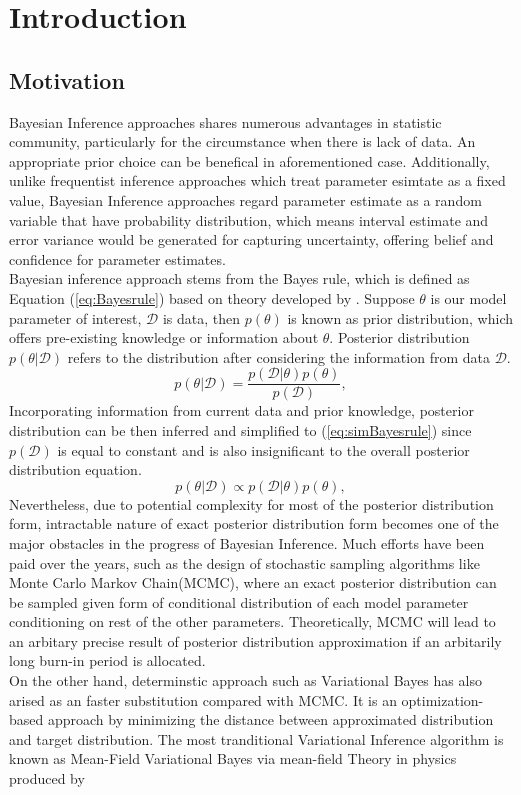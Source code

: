 \chapter{Introduction}
\label{Chapter1}
\section{Motivation}
Bayesian Inference approaches shares numerous advantages in statistic community, particularly for the circumstance when there is lack of data. An appropriate prior choice can be benefical in aforementioned case. Additionally, unlike frequentist inference approaches which treat parameter esimtate as a fixed value, Bayesian Inference approaches regard parameter estimate as a random variable that have probability distribution, which means interval estimate and error variance would be generated for capturing uncertainty, offering belief and confidence for parameter estimates.\\ Bayesian inference approach stems from the Bayes rule, which is defined as Equation (\ref{eq:Bayesrule}) based on theory developed by \cite{Beech1959}. Suppose $\theta$ is our model parameter of interest, $\mathcal{D}$ is data, then $p(\theta)$ is known as prior distribution, which offers pre-existing knowledge or information about $\theta$. Posterior distribution $p(\theta|\mathcal{D})$ refers to the distribution after considering the information from data $\mathcal{D}$.
\begin{equation}
	p(\theta|\mathcal{D}) = \frac{p(\mathcal{D}|\theta)p(\theta)}{p(\mathcal{D})},
	\label{eq:Bayesrule}
\end{equation}
Incorporating information from current data and prior knowledge, posterior distribution can be then inferred and simplified to (\ref{eq:simBayesrule}) since $p(\mathcal{D})$ is equal to constant and is also insignificant to the overall posterior distribution equation.
\begin{equation}
	p(\theta|\mathcal{D}) \propto p(\mathcal{D}|\theta)p(\theta),
	\label{eq:simBayesrule}
\end{equation}
Nevertheless, due to potential complexity for most of the posterior distribution form, intractable nature of exact posterior distribution form becomes one of the major obstacles in the progress of Bayesian Inference. Much efforts have been paid over the years, such as the design of stochastic sampling algorithms like Monte Carlo Markov Chain(MCMC), where an exact posterior distribution can be sampled given form of conditional distribution of each model parameter conditioning on rest of the other parameters. Theoretically, MCMC will lead to an arbitary precise result of posterior distribution approximation if an arbitarily long burn-in period is allocated.\\
On the other hand, determinstic approach such as Variational Bayes has also arised as an faster substitution compared with MCMC. It is an optimization-based approach by minimizing the distance between approximated distribution and target distribution. The most tranditional Variational Inference algorithm is known as Mean-Field Variational Bayes via mean-field Theory in physics produced by 



